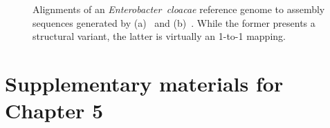 \begin{figure}[!hpt]
\centering
{}
\hfill
{}
\caption[Alignments of a \emph{Enterobacter~cloacae} reference genome to assembly sequences generated by \unicycler{} and \npgraph{}]{Alignments of an \emph{Enterobacter~cloacae} reference genome to assembly sequences generated by  (a)~\unicycler{} and (b)~\npgraph{}. While the former presents a structural variant, the latter is virtually an 1-to-1 mapping.}
\label{supp_fig:npgraph_ref}
\end{figure}

\chapter{Supplementary materials for Chapter 5}\label{app:concatemer}
\newpage

